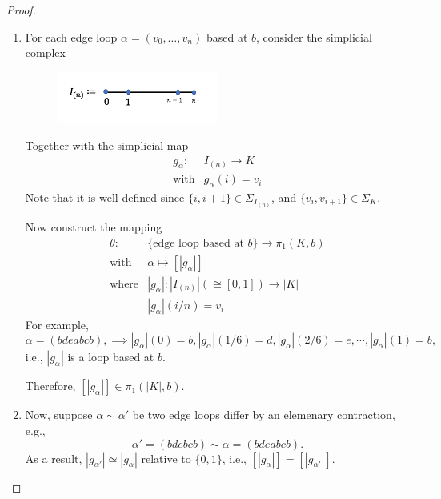 \begin{proof}
\begin{enumerate}
\item
For each edge loop $\alpha=(v_0,\dots,v_n)$ based at $b$, consider the simplicial complex 
\begin{figure}[H]
\centering
\includegraphics[width=0.5\textwidth]{week12/f_18}
\end{figure}
Together with the simplicial map
\[
\begin{array}{ll}
g_{\alpha}:&I_{(n)}\to K\\
\text{with}&g_{\alpha}(i)=v_i
\end{array}
\]
Note that it is well-defined since $\{i,i+1\}\in\Sigma_{I_{(n)}}$, and $\{v_i,v_{i+1}\}\in\Sigma_K$.

Now construct the mapping 
\[
\begin{array}{ll}
\theta:&\{\text{edge loop based at $b$}\}\to\pi_1(K,b)\\
\text{with}&\alpha\mapsto [|g_{\alpha}|]\\
\text{where}&|g_{\alpha}|:|I_{(n)}|(\cong[0,1])\to|K|\\
&|g_{\alpha}|(i/n) = v_i
\end{array}
\]
For example,
\[
\alpha = (bdeabcb), \implies
|g_\alpha|(0)=b,
|g_\alpha|(1/6) = d,
|g_\alpha|(2/6) = e,
\cdots,
|g_\alpha|(1) = b,
\]
i.e., $|g_\alpha|$ is a loop based at $b$.

Therefore, $[|g_\alpha|]\in\pi_1(|K|,b)$.
\item
Now, suppose $\alpha\sim \alpha'$ be two edge loops differ by an elemenary contraction, e.g.,
\[
\alpha'=(bdebcb)\sim\alpha=(bdeabcb).
\]
As a result, $|g_{\alpha'}|\simeq|g_{\alpha}|$ relative to $\{0,1\}$, i.e., $[|g_\alpha|]=[|g_{\alpha'}|]$.


\end{enumerate}
\end{proof}
